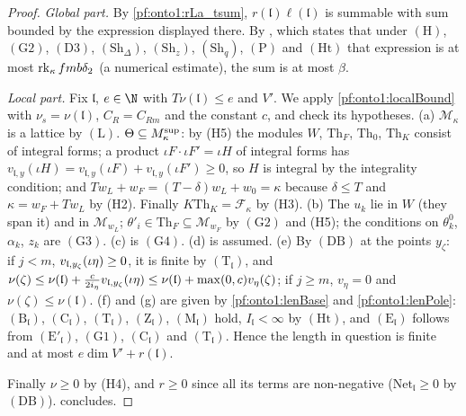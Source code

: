 \begin{proof}
\emph{Global part.} By \cref{pf:onto1:rLa_tsum}, $r(\mathfrak l)\ell(\mathfrak l)$ is summable with sum bounded by the
expression displayed there. By , which states that under
$(\mathrm H)$, $(\mathrm G2)$, $(\mathrm D3)$, $(\mathrm{Sh}_\Delta)$, $(\mathrm{Sh}_z)$, $(\mathrm{Sh}_q)$, $(\mathrm P)$ and
$(\mathrm{Ht})$ that expression is at most $\operatorname{rk}_\kappa fmb\delta_2$ (a numerical estimate), the sum is at most
$\beta$.

\emph{Local part.} Fix $\mathfrak l$, $e\in\N$ with $T\nu(\mathfrak l)\le e$ and $V'$. We apply
\cref{pf:onto1:localBound} with $\nu_s=\nu(\mathfrak l)$, $C_R=C_{Rm}$ and the constant $c$, and check its hypotheses.
(a) $\mathcal M_\kappa$ is a lattice by $(\mathrm L)$. $\Theta\subseteq M^{\mathrm{sup}}_\kappa$: by (H5) the modules $W$,
$\mathrm{Th}_F$, $\mathrm{Th}_0$, $\mathrm{Th}_K$ consist of integral forms; a product $\iota F\cdot\iota F'=\iota H$ of integral forms
has $v_{\mathfrak l,y}(\iota H)=v_{\mathfrak l,y}(\iota F)+v_{\mathfrak l,y}(\iota F')\ge0$, so $H$ is integral by the integrality
condition; and $Tw_L+w_F=(T-\delta)w_L+w_0=\kappa$ because $\delta\le T$ and $\kappa=w_F+Tw_L$ by (H2). Finally
$K\mathrm{Th}_K=\mathcal F_\kappa$ by (H3). (b) The $u_k$ lie in $W$ (they span it) and in $\mathcal M_{w_L}$; $\theta'_i\in\mathrm{Th}_F
\subseteq\mathcal M_{w_F}$ by $(\mathrm G2)$ and (H5); the conditions on $\theta^0_k$, $\alpha_k$, $z_k$ are $(\mathrm G3)$. (c) is
$(\mathrm G4)$. (d) is assumed. (e) By $(\mathrm{DB})$ at the points $y_\zeta$: if $j<m$, $v_{\mathfrak l,y_\zeta}(\iota\eta)\ge0$,
it is finite by $(\mathrm T_{\mathfrak l})$, and $\nu(\zeta)\le\nu(\mathfrak l)+\frac c{2i_\eta}v_{\mathfrak l,y_\zeta}(\iota
\eta)\le\nu(\mathfrak l)+\max(0,c)v_\eta(\zeta)$; if $j\ge m$, $v_\eta=0$ and $\nu(\zeta)\le\nu(\mathfrak l)$. (f) and (g)
are given by \cref{pf:onto1:lenBase} and \cref{pf:onto1:lenPole}: $(\mathrm B_{\mathfrak
l})$, $(\mathrm C_{\mathfrak l})$, $(\mathrm T_{\mathfrak l})$, $(\mathrm Z_{\mathfrak l})$, $(\mathrm M_{\mathfrak l})$ hold, $I_{\mathfrak
l}<\infty$ by $(\mathrm{Ht})$, and $(\mathrm E_{\mathfrak l})$ follows from $(\mathrm E'_{\mathfrak l})$, $(\mathrm G1)$, $(\mathrm
C_{\mathfrak l})$ and $(\mathrm T_{\mathfrak l})$. Hence the length in question is finite and at most $e\dim V'+r(\mathfrak l)$.

Finally $\nu\ge0$ by (H4), and $r\ge0$ since all its terms are non-negative ($\mathrm{Net}_{\mathfrak l}\ge0$ by
$(\mathrm{DB})$).  concludes.
\end{proof}

